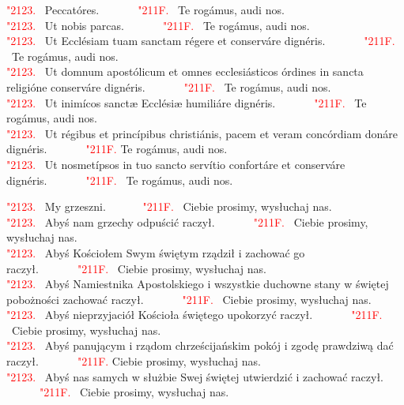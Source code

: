 \documentclass[10pt,a5paper]{book}
\newcommand{\kol}{red}
\newcommand{\textjuni}[1]{{\fontspec{Junicode-Regular}#1}}
\newcommand{\vv}{\textcolor{\kol}{\textjuni{\char"2123. }}}
\newcommand{\rrr}{\newline\textcolor{\kol}{\textjuni{~~~~~~\char"211F. }}}
\newcommand{\oremuss}[2]{
	\begin{sloppypar}
		\begin{paracol}{2}
			\setlength{\columnsep}{0em}
			\begin{leftcolumn}
				#1
			\end{leftcolumn}
			\begin{rightcolumn}
				#2
			\end{rightcolumn}
		\end{paracol}
	\end{sloppypar}}
\begin{document}
\oremuss{\vv Peccatóres. \rrr Te rogámus, audi nos.\\
	\vv Ut nobis parcas. \rrr Te rogámus, audi nos.\\
	\vv Ut Ecclésiam tuam sanctam régere et conserváre dignéris. \rrr Te
	rogámus, audi nos.\\
	\vv Ut domnum apostólicum et omnes ecclesiásticos órdines in sancta
	religióne conserváre dignéris. \rrr Te rogámus, audi nos.\\
	\vv Ut inimícos sanctæ Ecclésiæ humiliáre dignéris. \rrr Te rogámus, audi
	nos.\\
	\vv Ut régibus et princípibus christiánis, pacem et veram concórdiam donáre
	dignéris. \rrr Te rogámus, audi nos.\\
	\vv Ut nosmetípsos in tuo sancto servítio confortáre et conserváre
	dignéris. \rrr Te rogámus, audi nos.}{\vv My grzeszni. \rrr Ciebie prosimy,
	wysłuchaj nas.\\
	\vv Abyś nam grzechy odpuścić raczył. \rrr Ciebie prosimy, wysłuchaj nas.\\
	\vv Abyś Kościołem Swym świętym rządził i zachować go raczył. \rrr Ciebie
	prosimy, wysłuchaj nas.\\
	\vv Abyś Namiestnika Apostolskiego i wszystkie duchowne stany w świętej
	pobożności zachować raczył. \rrr Ciebie prosimy, wysłuchaj nas.\\
	\vv Abyś nieprzyjaciół Kościoła świętego upokorzyć raczył. \rrr Ciebie
	prosimy, wysłuchaj nas.\\
	\vv Abyś panującym i rządom chrześcijańskim pokój i zgodę prawdziwą dać
	raczył. \rrr Ciebie prosimy, wysłuchaj nas.\\
	\vv Abyś nas samych w służbie Swej świętej utwierdzić i zachować raczył.
	\rrr Ciebie prosimy, wysłuchaj nas.}
\end{document}
